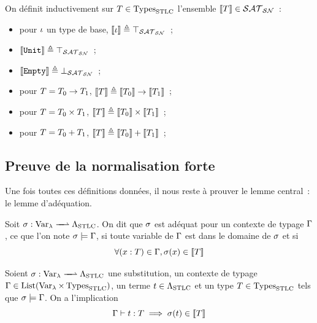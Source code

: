 \begin{definition}
  On définit inductivement sur $T\in\operatorname{Types}_{\mathrm{STLC}}$ l'ensemble
  $\llbracket T\rrbracket \in \mathcal{SAT}_{\mathcal{SN}}$~:
  \begin{itemize}
  \item pour $\iota$ un type de base,
    $\llbracket\iota\rrbracket \triangleq \top_{\mathcal{SAT}_{\mathcal{SN}}}$~;
  \item $\llbracket{\normalfont\texttt{Unit}}\rrbracket \triangleq \top_{\mathcal{SAT}_{\mathcal{SN}}}$~;
  \item $\llbracket{\normalfont\texttt{Empty}}\rrbracket \triangleq \bot_{\mathcal{SAT}_{\mathcal{SN}}}$~;
  \item pour $T = T_0 \to T_1$,
    $\llbracket T\rrbracket\triangleq \llbracket T_0\rrbracket\to\llbracket T_1\rrbracket$~;
  \item pour $T = T_0 \times T_1$,
    $\llbracket T\rrbracket\triangleq \llbracket T_0\rrbracket\times\llbracket T_1\rrbracket$~;
  \item pour $T = T_0 + T_1$,
    $\llbracket T\rrbracket\triangleq \llbracket T_0\rrbracket+\llbracket T_1\rrbracket$~;
  \end{itemize}
\end{definition}

\subsection{Preuve de la normalisation forte}

Une fois toutes ces définitions données, il nous reste à prouver le lemme
central~: le lemme d'adéquation.

\begin{definition}
  Soit $\makeFunNamePartial{\subSimul}{\lamVar}{\STLCSet}$. On dit que
  $\sigma$ est adéquat pour un contexte de typage $\Gamma$, ce que l'on
  note $\sigma\models\Gamma$, si toute variable de $\Gamma$ est dans le
  domaine de $\sigma$ et si
  \[\forall (x : T) \in \Gamma, \sigma(x) \in \llbracket T\rrbracket\]
\end{definition}

\begin{lemma}[Adéquation]
  Soient $\makeFunNamePartial{\subSimul}{\lamVar}{\STLCSet}$ une substitution,
  un contexte de typage
  $\Gamma \in \operatorname{List}(\operatorname{Var}_{\lambda}\times\operatorname{Types}_{\mathrm{STLC}})$, un terme $t \in \Lambda_{\mathrm{STLC}}$ et un
  type $T \in \operatorname{Types}_{\mathrm{STLC}}$ tels que $\sigma \models\Gamma$. On a
  l'implication
  \[\Gamma\mathrel{\vdash} t : T \implies\sigma(t) \in \llbracket T\rrbracket\]
\end{lemma}

